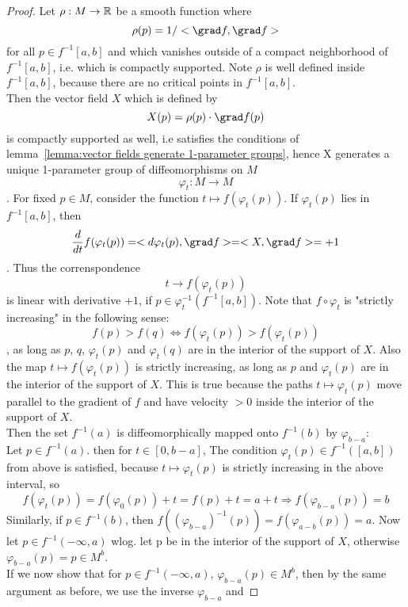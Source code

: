 \begin{proof}
   Let $\rho: M \rightarrow {\mathbb R}$ be a smooth function where 
   \[ \rho(p) = 1/<\grad f, \grad f> \]
   for all $p \in f^{-1}[a, b]$ and which vanishes outside of a compact 
   neighborhood of $f^{-1}[a, b]$, i.e. which is compactly supported.
   Note $\rho$ is well defined inside $f^{-1}[a, b]$, because there are no 
   critical points in $f^{-1}[a, b]$. \\ 
   Then the vector field $X$ which is defined by
   \[ X(p) = \rho(p) \cdot \grad f (p) \]
   is compactly supported as well, i.e satisfies the conditions of 
   lemma~\ref{lemma:vector fields generate 1-parameter groups}, hence X generates 
   a unique 1-parameter group of diffeomorphisms on $M$
   \[ \varphi_t : M \rightarrow M \]. 
   For fixed $p \in M$, consider the function 
   $ t \mapsto f(\varphi_t(p)) $. If $\varphi_t(p)$ lies in $f^{-1}[a, b]$, then
   \[ \frac{d}{dt}f (\varphi_t(p)) = <d\varphi_t(p), \grad f> = <X, \grad f> = + 1 \].
   Thus the correnspondence 
   \[ t \rightarrow f(\varphi_t(p)) \]
   is linear with derivative $+1$, if $p \in \varphi_t^{-1}(f^{-1}[a, b])$. 
   Note that $f \circ \varphi_t$ is "strictly increasing" in the following sense:
   \[ f(p) > f(q) \Leftrightarrow f(\varphi_t(p)) > f(\varphi_t(p)) \]
   , as long as $p$, $q$, $\varphi_t(p)$ and $\varphi_t(q)$ are in the interior
   of the support of $X$. Also the map $t \mapsto f(\varphi_t(p))$ is strictly
   increasing, as long as $p$ and $\varphi_t(p)$ are in the interior of the
   support of $X$. This is true because the paths $t \mapsto \varphi_t(p)$ move
   parallel to the gradient of $f$ and have velocity $>0$ inside the interior 
   of the support of $X$. \\
   Then the set $f^{-1}(a)$ is diffeomorphically mapped onto $f^{-1}(b)$ by $\varphi_{b-a}$: \\
   Let $p \in f^{-1}(a)$. then for $t \in [0, b-a]$, The condition 
   $\varphi_t(p) \in f^{-1}([a, b])$ from above is satisfied, because
   $t \mapsto \varphi_t(p)$ is strictly increasing in the above interval, so 
   \[ f(\varphi_t(p)) = f(\varphi_0(p)) + t = f(p) + t 
   = a + t \Rightarrow f(\varphi_{b-a}(p)) = b \]
   Similarly, if $p \in f^{-1}(b)$, then 
   $f((\varphi_{b-a})^{-1}(p)) = f(\varphi_{a-b}(p)) = a$. 
   Now let $p \in f^{-1}(-\infty, a)$ wlog. let p be in the interior of the 
   support of $X$, otherwise $\varphi_{b-a}(p) = p \in M^b$. \\
   If we now show that for $p \in f^{-1}(-\infty, a)$, $\varphi_{b-a}(p) \in M^b$,
   then by the same argument as before, we use the inverse $\varphi_{b-a}$ and

\end{proof}
